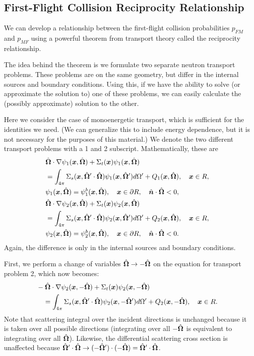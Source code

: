 \subsection{First-Flight Collision Reciprocity Relationship}

We can develop a relationship between the first-flight collision probabilities $p_{FM}$ and $p_{MF}$ using a powerful theorem from transport theory called the reciprocity relationship. 

The idea behind the theorem is we formulate two separate neutron transport problems. These problems are on the same geometry, but differ in the internal sources and boundary conditions. Using this, if we have the ability to solve (or approximate the solution to) one of these problems, we can easily calculate the (possibly approximate) solution to the other. 

Here we consider the case of monoenergetic transport, which is sufficient for the identities we need. (We can generalize this to include energy dependence, but it is not necessary for the purposes of this material.) We denote the two different transport problems with a 1 and 2 subscript. Mathematically, these are
\begin{subequations}
\begin{align}
  &\hat{\mathbf{\Omega}} \cdot \nabla \psi_1(\bm{x},\hat{\mathbf{\Omega}}) + \Sigma_t(\bm{x}) \psi_1(\bm{x},\hat{\mathbf{\Omega}}) \nonumber \\
  &= \int_{4\pi} \Sigma_s(\bm{x},\hat{\mathbf{\Omega}}' \cdot \hat{\mathbf{\Omega}}) \psi_1(\bm{x},\hat{\mathbf{\Omega}}') d\Omega' + Q_1(\bm{x},\hat{\mathbf{\Omega}}), \quad \bm{x} \in R, \\*
  &\psi_1(\bm{x},\hat{\mathbf{\Omega}}) = \psi_1^b(\bm{x},\hat{\mathbf{\Omega}}), \quad \bm{x} \in \partial R, \quad \hat{\bm{n}} \cdot \hat{\mathbf{\Omega}} < 0, \\
  &\hat{\mathbf{\Omega}} \cdot \nabla \psi_2(\bm{x},\hat{\mathbf{\Omega}}) + \Sigma_t(\bm{x}) \psi_2(\bm{x},\hat{\mathbf{\Omega}}) \nonumber \\
  &= \int_{4\pi} \Sigma_s(\bm{x},\hat{\mathbf{\Omega}}' \cdot \hat{\mathbf{\Omega}}) \psi_2(\bm{x},\hat{\mathbf{\Omega}}') d\Omega' + Q_2(\bm{x},\hat{\mathbf{\Omega}}), \quad \bm{x} \in R, \\*
  &\psi_2(\bm{x},\hat{\mathbf{\Omega}}) = \psi_2^b(\bm{x},\hat{\mathbf{\Omega}}), \quad \bm{x} \in \partial R, \quad \hat{\bm{n}} \cdot \hat{\mathbf{\Omega}} < 0 .
\end{align}
\end{subequations} 
Again, the difference is only in the internal sources and boundary conditions.

First, we perform a change of variables $\hat{\mathbf{\Omega}} \rightarrow -\hat{\mathbf{\Omega}}$ on the equation for transport problem 2, which now becomes:
\begin{align}
  &-\hat{\mathbf{\Omega}} \cdot \nabla \psi_2(\bm{x},-\hat{\mathbf{\Omega}}) + \Sigma_t(\bm{x}) \psi_2(\bm{x},-\hat{\mathbf{\Omega}}) \nonumber \\*
  &\quad = \int_{4\pi} \Sigma_s(\bm{x},\hat{\mathbf{\Omega}}' \cdot \hat{\mathbf{\Omega}}) \psi_2(\bm{x},-\hat{\mathbf{\Omega}}') d\Omega' + Q_2(\bm{x},-\hat{\mathbf{\Omega}}), \quad \bm{x} \in R .
\end{align}
Note that scattering integral over the incident directions is unchanged because it is taken over all possible directions (integrating over all $-\hat{\mathbf{\Omega}}$ is equivalent to integrating over all $\hat{\mathbf{\Omega}}$). Likewise, the differential scattering cross section is unaffected because $\hat{\mathbf{\Omega}}' \cdot \hat{\mathbf{\Omega}} \rightarrow (-\hat{\mathbf{\Omega}}') \cdot (-\hat{\mathbf{\Omega}}) = \hat{\mathbf{\Omega}}' \cdot \hat{\mathbf{\Omega}}$.

